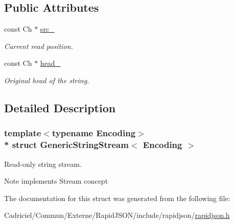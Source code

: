 \subsection*{Public Attributes}
\begin{DoxyCompactItemize}
\item 
const Ch $\ast$ \hyperlink{struct_generic_string_stream_aeda813798e3f2d6bfdac86afc11b6b80}{src\+\_\+}\hypertarget{struct_generic_string_stream_aeda813798e3f2d6bfdac86afc11b6b80}{}\label{struct_generic_string_stream_aeda813798e3f2d6bfdac86afc11b6b80}

\begin{DoxyCompactList}\small\item\em Current read position. \end{DoxyCompactList}\item 
const Ch $\ast$ \hyperlink{struct_generic_string_stream_a3c86ef1e1f0655028cb8a3afce11ee4f}{head\+\_\+}\hypertarget{struct_generic_string_stream_a3c86ef1e1f0655028cb8a3afce11ee4f}{}\label{struct_generic_string_stream_a3c86ef1e1f0655028cb8a3afce11ee4f}

\begin{DoxyCompactList}\small\item\em Original head of the string. \end{DoxyCompactList}\end{DoxyCompactItemize}


\subsection{Detailed Description}
\subsubsection*{template$<$typename Encoding$>$\\*
struct Generic\+String\+Stream$<$ Encoding $>$}

Read-\/only string stream. 

\begin{DoxyNote}{Note}
implements Stream concept 
\end{DoxyNote}


The documentation for this struct was generated from the following file\+:\begin{DoxyCompactItemize}
\item 
Cadriciel/\+Commun/\+Externe/\+Rapid\+J\+S\+O\+N/include/rapidjson/\hyperlink{rapidjson_8h}{rapidjson.\+h}\end{DoxyCompactItemize}
